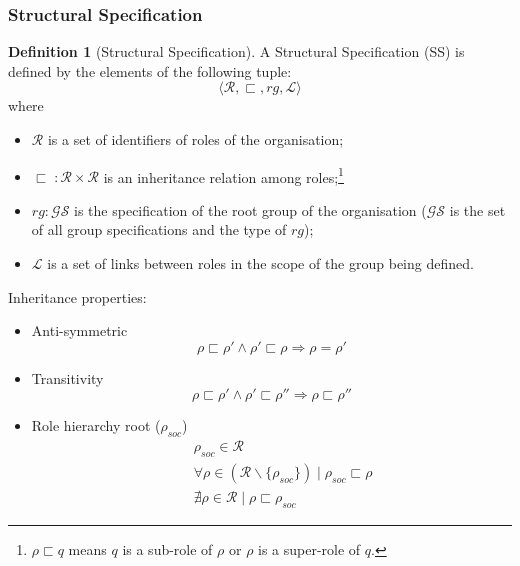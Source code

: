 \documentclass{article}
\newcommand{\st}{\mid}
\newcommand{\set}[1]{\mathcal{#1}}
\newcommand{\subrole}{\sqsubset}
\theoremstyle{definition} \newtheorem{definition}{Definition}
\begin{document}
\subsubsection{Structural Specification}


\begin{definition}[Structural Specification]
  A Structural Specification (SS) is defined by the
  elements of the following tuple:
  \begin{displaymath}
    \langle \set{R}, \sqsubset, rg, \set{L} \rangle
  \end{displaymath}
  where
  \begin{itemize}
  \item $\set{R}$ is a set of identifiers of roles of the organisation;
  \item $\sqsubset \; : \set{R} \times \set{R}$ is an inheritance
    relation among roles;\footnote{$\rho \subrole q$ means $q$ is a
      sub-role of $\rho$ or $\rho$ is a super-role of $q$.}
  \item $rg : \set{GS}$ is the specification of the root group of
    the organisation ($\set{GS}$ is the set of all group
    specifications and the type of $rg$);
  \item $\set{L}$ is a set of links between roles in the scope of
    the group being defined.
  \end{itemize}
Inheritance properties:
\begin{itemize}
\item Anti-symmetric
  \begin{equation}
  \rho \subrole \rho' \land \rho' \subrole \rho   \Rightarrow \rho = \rho'
 \end{equation}

\item Transitivity
  \begin{equation}
    \rho \subrole \rho' \land \rho' \subrole \rho'' \Rightarrow \rho \subrole \rho''
  \end{equation}

\item Role hierarchy root ($\rho_{soc}$)
  \begin{eqnarray}
    &&\rho_{soc} \in \mathcal{R}\\
    &&\forall \rho \in (\mathcal{R} \backslash \{\rho_{soc}\}) \st {\rho_{soc} \subrole \rho}\\
    &&\nexists \rho \in \mathcal{R} \st \rho \subrole \rho_{soc}
  \end{eqnarray}

\end{itemize}
\end{definition}
\end{document}
